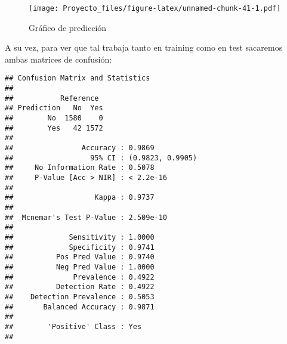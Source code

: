 \documentclass[
]{article}
\newenvironment{Shaded}{\begin{snugshade}}{\end{snugshade}}
\newcommand{\AttributeTok}[1]{\textcolor[rgb]{0.77,0.63,0.00}{#1}}
\newcommand{\DecValTok}[1]{\textcolor[rgb]{0.00,0.00,0.81}{#1}}
\newcommand{\FunctionTok}[1]{\textcolor[rgb]{0.00,0.00,0.00}{#1}}
\newcommand{\NormalTok}[1]{#1}
\newcommand{\SpecialCharTok}[1]{\textcolor[rgb]{0.00,0.00,0.00}{#1}}
\newcommand{\StringTok}[1]{\textcolor[rgb]{0.31,0.60,0.02}{#1}}
\begin{document}
\begin{figure}
\centering
\texttt{[image: Proyecto\_files/figure-latex/unnamed-chunk-41-1.pdf]}
\caption{Gráfico de predicción}
\end{figure}

\newpage

A su vez, para ver que tal trabaja tanto en training como en test
sacaremos ambas matrices de confusión:

\begin{Shaded}
\end{Shaded}

\begin{verbatim}
## Confusion Matrix and Statistics
## 
##           Reference
## Prediction   No  Yes
##        No  1580    0
##        Yes   42 1572
##                                           
##                Accuracy : 0.9869          
##                  95% CI : (0.9823, 0.9905)
##     No Information Rate : 0.5078          
##     P-Value [Acc > NIR] : < 2.2e-16       
##                                           
##                   Kappa : 0.9737          
##                                           
##  Mcnemar's Test P-Value : 2.509e-10       
##                                           
##             Sensitivity : 1.0000          
##             Specificity : 0.9741          
##          Pos Pred Value : 0.9740          
##          Neg Pred Value : 1.0000          
##              Prevalence : 0.4922          
##          Detection Rate : 0.4922          
##    Detection Prevalence : 0.5053          
##       Balanced Accuracy : 0.9871          
##                                           
##        'Positive' Class : Yes             
## 
\end{verbatim}

\begin{Shaded}
\end{Shaded}
\end{document}
